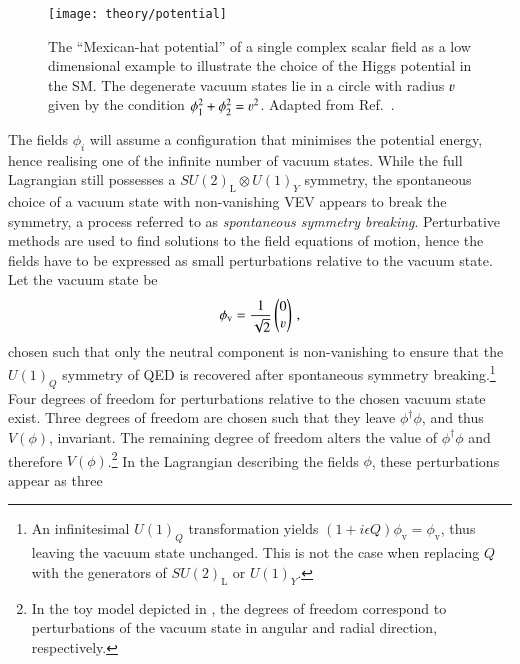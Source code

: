 \begin{figure}[htbp]
  \centering

  \texttt{[image: theory/potential]}

  \caption[The ``Mexican-hat potential'' of a complex scalar field.]{The
    ``Mexican-hat potential'' of a single complex scalar field as a low
    dimensional example to illustrate the choice of the Higgs potential in the
    SM. The degenerate vacuum states lie in a circle with radius $\varv$ given by
    the condition $\phi_1^2 + \phi_2^2 = \varv^2$. Adapted from
    Ref.~\cite{higgs_potential_tikz}.}%
  \label{fig:mexican_hat}
\end{figure}

The fields $\phi_i$ will assume a configuration that minimises the potential
energy, hence realising one of the infinite number of vacuum states. While the
full Lagrangian still possesses a $SU(2)_{\text{L}} \otimes U(1)_Y$ symmetry,
the spontaneous choice of a vacuum state with non-vanishing VEV appears to break
the symmetry, a process referred to as \emph{spontaneous symmetry
  breaking}. Perturbative methods are used to find solutions to the field
equations of motion, hence the fields have to be expressed as small
perturbations relative to the vacuum state. Let the vacuum state be
\begin{align*}
  \phi_{\text{v}} = \frac{1}{\sqrt{2}}
  \begin{pmatrix}
    0 \\
    \varv
  \end{pmatrix} \,\text{,}
\end{align*}
chosen such that only the neutral component is non-vanishing to ensure that the
$U(1)_Q$ symmetry of QED is recovered after spontaneous symmetry
breaking.\footnote{An infinitesimal $U(1)_Q$ transformation yields
  $(1 + i \epsilon Q) \phi_{\text{v}} = \phi_{\text{v}}$, thus leaving the
  vacuum state unchanged. This is not the case when replacing $Q$ with the
  generators of $SU(2)_{\text{L}}$ or $U(1)_Y$.} Four degrees of freedom for
perturbations relative to the chosen vacuum state exist. Three degrees of
freedom are chosen such that they leave $\phi^\dagger \phi$, and thus $V(\phi)$,
invariant. The remaining degree of freedom alters the value of
$\phi^\dagger \phi$ and therefore $V(\phi)$.\footnote{In the toy model depicted
  in , the degrees of freedom correspond to perturbations
  of the vacuum state in angular and radial direction, respectively.} In the
Lagrangian describing the fields $\phi$, these perturbations appear as three

